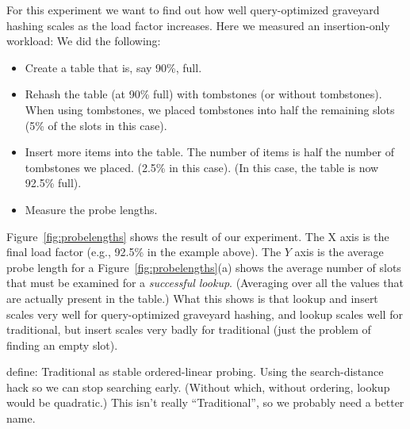 \documentclass[10pt]{article}
\theoremstyle{remark}
\theoremstyle{remark}
\newcommand{\figref}[1]{Figure~\ref{fig:#1}}
\begin{document}
For this experiment we want to find out how well query-optimized
graveyard hashing scales as the load factor increases.  Here we
measured an insertion-only workload: We did the following:
\begin{itemize}
\item Create a table that is, say 90\%, full.
\item Rehash the table (at 90\% full) with tombstones (or without
  tombstones).  When using tombstones, we placed tombstones into half
  the remaining slots (5\% of the slots in this case).
\item Insert more items into the table.  The number of items is half
  the number of tombstones we placed.  (2.5\% in this case).  (In this
  case, the table is now 92.5\% full).
\item Measure the probe lengths.
\end{itemize}

\figref{probelengths} shows the result of our experiment.
The X axis is the final load factor (e.g., 92.5\% in the example above).  The $Y$ axis is the average probe length for a 
\figref{probelengths}(a) shows the average number of slots that must be
examined for a \textit{successful lookup}.  (Averaging over all the
values that are actually present in the table.)  What this shows is that lookup and insert scales very well for query-optimized graveyard hashing, and lookup scales well for traditional, but insert scales very badly for traditional (just the problem of finding an empty slot).

define: Traditional as stable ordered-linear probing.  Using the
search-distance hack so we can stop searching early.  (Without which,
without ordering, lookup would be quadratic.)  This isn't really
``Traditional'', so we probably need a better name.
\end{document}
